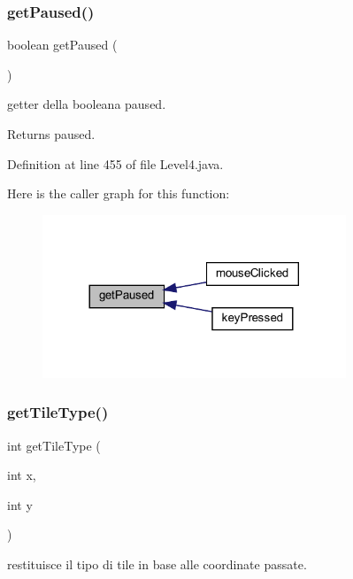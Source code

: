 \subsubsection{\texorpdfstring{get\+Paused()}{getPaused()}}
{\footnotesize\ttfamily boolean get\+Paused (\begin{DoxyParamCaption}{ }\end{DoxyParamCaption})}



getter della booleana paused. 

\begin{DoxyReturn}{Returns}
paused. 
\end{DoxyReturn}


Definition at line 455 of file Level4.\+java.

Here is the caller graph for this function\+:\nopagebreak
\begin{figure}[H]
\begin{center}
\leavevmode
\includegraphics[width=257pt]{classscenes_1_1_level4_af5e9f906de91e4d6400bb7f27cd563f3_icgraph}
\end{center}
\end{figure}
\mbox{\label{classscenes_1_1_level4_ac689e72523c8460ac3160526d310b1b7}} 
\subsubsection{\texorpdfstring{get\+Tile\+Type()}{getTileType()}}
{\footnotesize\ttfamily int get\+Tile\+Type (\begin{DoxyParamCaption}\item[{int}]{x,  }\item[{int}]{y }\end{DoxyParamCaption})}



restituisce il tipo di tile in base alle coordinate passate. 


